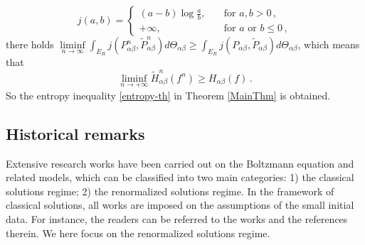 \documentclass[reqno,11pt]{amsart}
\numberwithin{equation}{section}
\begin{document}
\begin{equation*}
j(a,b)=\left\{\begin{array}{rl}
	(a-b) \log \frac{a}{b}, & \quad \text{for } a, b>0 \,, \\
	+\infty, & \quad \text{for } a \text { or } b \leq 0 \,,
\end{array}\right.
\end{equation*}
there holds $\liminf\limits_{n\rightarrow \infty} \int_{E_R}j(P^n_{\alpha \beta},\tilde{P}^n_{\alpha \beta})d \Theta_{\alpha \beta } \geq \int_{E_R}j(P_{\alpha \beta} ,\tilde{P}_{\alpha \beta}) d \Theta_{\alpha \beta }$, which means that 
$$ \liminf\limits_{n \to + \infty} \tilde{H}_{\alpha \beta }^n (f^n) \geq H_{\alpha \beta }(f) \,. $$ 
So the entropy inequality \eqref{entropy-th} in Theorem \ref{MainThm} is obtained.


\subsection{Historical remarks}

Extensive research works have been carried out on the Boltzmann equation and related models, which can be classified into two main categories: 1) the classical solutions regime; 2) the renormalized solutions regime. In the framework of classical solutions, all works are imposed on the assumptions of the small initial data. For instance, the readers can be referred to the works \cite{Guo-CPAM-2006,Guo-ARMA-2010,GJJ-CPAM-2010,JL-APDE-2022,JLT-TAMS-2024,JLZ-ARMA-2023,JXZ-IUMJ-2018,SG-ARMA-2008} and the references therein. We here focus on the renormalized solutions regime.
\end{document}
